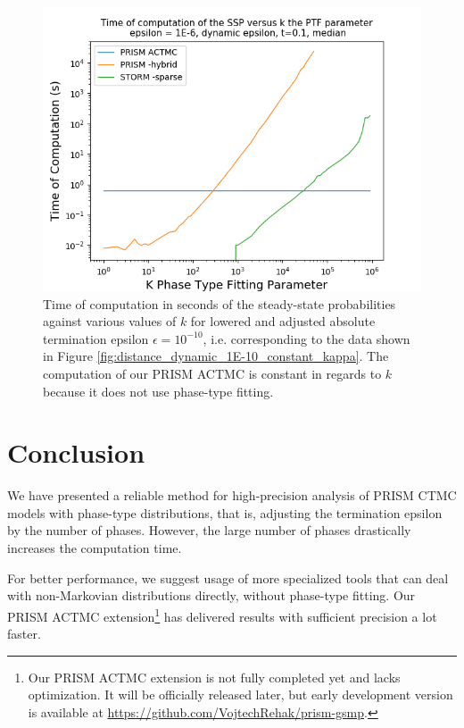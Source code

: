 \documentclass[paper=a4, fontsize=11pt]{scrartcl}
\numberwithin{equation}{section}		%
\numberwithin{figure}{section}			%
\numberwithin{table}{section}				%
\begin{document}
	\begin{figure}[H]
		\begin{center}
			\includegraphics[trim=0.2cm 0cm 0cm 1.35cm,width=15cm, clip]{picture/New_model/1E-6/performance_dynamic.png}
		\end{center}
		\caption{Time of computation in seconds of the steady-state probabilities against various values of $k$ for lowered and adjusted absolute termination epsilon $\epsilon = 10^{-10}$, i.e. corresponding to the data shown in Figure \ref{fig:distance_dynamic_1E-10_constant_kappa}. The computation of our PRISM ACTMC is constant in regards to $k$ because it does not use phase-type fitting. }
		\label{fig:performance_dynamic}
	\end{figure}
	
	\pagebreak
	\section{Conclusion}
	We have presented a reliable method for high-precision analysis of PRISM CTMC models with phase-type distributions, that is, adjusting the termination epsilon by the number of phases. However, the large number of phases drastically increases the computation time.
	
	For better performance, we suggest usage of more specialized tools that can deal with non-Markovian distributions directly, without phase-type fitting. Our PRISM ACTMC extension\footnote{Our PRISM ACTMC extension is not fully completed yet and lacks optimization. It will be officially released later, but early development version is available at \href{https://github.com/VojtechRehak/prism-gsmp}{https://github.com/VojtechRehak/prism-gsmp}.} has delivered results with sufficient precision a lot faster.
	
\end{document}
